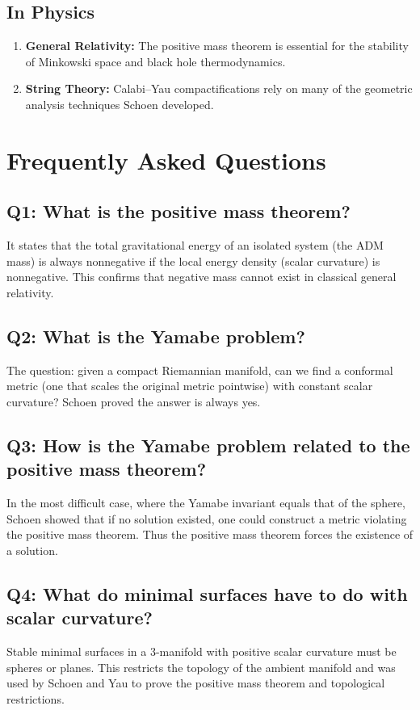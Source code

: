 \subsection{In Physics}

\begin{enumerate}
    \item \textbf{General Relativity:} The positive mass theorem is essential for the stability of Minkowski space and black hole thermodynamics.
    \item \textbf{String Theory:} Calabi--Yau compactifications rely on many of the geometric analysis techniques Schoen developed.
\end{enumerate}

\section{Frequently Asked Questions}

\subsection*{Q1: What is the positive mass theorem?}
It states that the total gravitational energy of an isolated system (the ADM mass) is always nonnegative if the local energy density (scalar curvature) is nonnegative. This confirms that negative mass cannot exist in classical general relativity.

\subsection*{Q2: What is the Yamabe problem?}
The question: given a compact Riemannian manifold, can we find a conformal metric (one that scales the original metric pointwise) with constant scalar curvature? Schoen proved the answer is always yes.

\subsection*{Q3: How is the Yamabe problem related to the positive mass theorem?}
In the most difficult case, where the Yamabe invariant equals that of the sphere, Schoen showed that if no solution existed, one could construct a metric violating the positive mass theorem. Thus the positive mass theorem forces the existence of a solution.

\subsection*{Q4: What do minimal surfaces have to do with scalar curvature?}
Stable minimal surfaces in a 3-manifold with positive scalar curvature must be spheres or planes. This restricts the topology of the ambient manifold and was used by Schoen and Yau to prove the positive mass theorem and topological restrictions.

